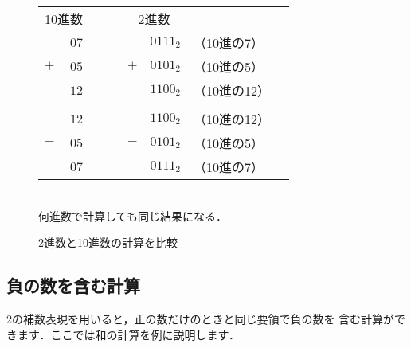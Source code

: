 \begin{figure}[tbp]
\begin{center}
{\small\begin{tabular}{  l r l  l r l l}
\multicolumn{2}{c}{10進数}  & ~~~  & \multicolumn{2}{c}{2進数} & \\
                     & $07$ &      &     & $0111_2$ & （10進の7） \\
                 $+$ & $05$ &      & $+$ & $0101_2$ & （10進の5） \\
\cline{1-2} \cline{4-5}
                     & $12$ &      &     & $1100_2$ & （10進の12） \\
&&&&&&\\
                     & $12$ &      &     & $1100_2$ & （10進の12） \\
                 $-$ & $05$ &      & $-$ & $0101_2$ & （10進の5） \\
\cline{1-2} \cline{4-5}
                     & $07$ &      &     & $0111_2$ & （10進の7） \\
\end{tabular}\\
\vspace{0.2cm}
何進数で計算しても同じ結果になる．
}
\caption{2進数と10進数の計算を比較}
\label{fig:chap2:cal2vs10}
\end{center}
\end{figure}

\subsection{負の数を含む計算}

2の補数表現を用いると，正の数だけのときと同じ要領で負の数を
含む計算ができます．ここでは和の計算を例に説明します．

